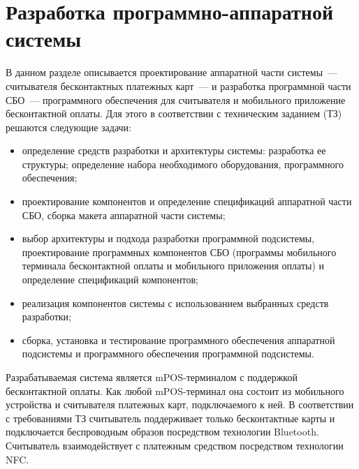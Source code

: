 \newpage



\section{Разработка программно-аппаратной системы}

В данном разделе описывается проектирование аппаратной части системы~--- считывателя бесконтактных платежных карт~--- и разработка программной части СБО~--- программного обеспечения для считывателя и мобильного приложение бесконтактной оплаты.
Для этого в соответствии с техническим заданием (ТЗ) решаются следующие задачи:

\begin{itemize}
    \item определение средств разработки и архитектуры системы: разработка ее структуры; определение набора необходимого оборудования, программного обеспечения;
    \item проектирование компонентов и определение спецификаций аппаратной части СБО, сборка макета аппаратной части системы;
    \item выбор архитектуры и подхода разработки программной подсистемы, проектирование программных компонентов СБО (программы мобильного терминала бесконтактной оплаты и мобильного приложения оплаты) и определение спецификаций компонентов;
    \item реализация компонентов системы с использованием выбранных средств разработки;
    \item сборка, установка и тестирование программного обеспечения аппаратной подсистемы и программного обеспечения программной подсистемы.
\end{itemize}

Разрабатываемая система является mPOS-терминалом с поддержкой бесконтактной оплаты.
Как любой mPOS-терминал она состоит из мобильного устройства и считывателя платежных карт, подключаемого к ней.
В соответствии с требованиями ТЗ считыватель поддерживает только бесконтактные карты и подключается беспроводным образов посредством технологии Bluetooth.
Считыватель взаимодействует с платежным средством посредством технологии NFC.

